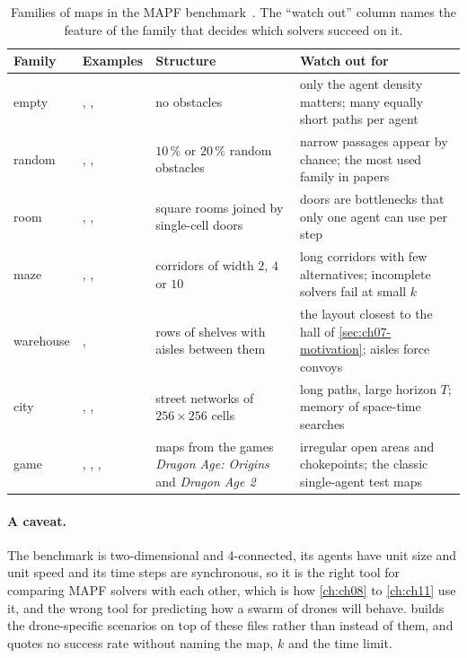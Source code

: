 \begin{table}[!htb]
  \centering\small
  \caption{Families of maps in the MAPF benchmark~\cite{stern2019mapf}. The
  ``watch out'' column names the feature of the family that decides which
  solvers succeed on it.}
  \label{tab:ch07-maps}
  \begin{tabularx}{\textwidth}{@{}lL{4.3cm}L{3.2cm}Y@{}}
  \toprule
  Family & Examples & Structure & Watch out for\\
  \midrule
  empty & , ,  & no obstacles & only the agent density matters; many equally short paths per agent\\
  random & , ,  & $10\,\%$ or $20\,\%$ random obstacles & narrow passages appear by chance; the most used family in papers\\
  room & , ,  & square rooms joined by single-cell doors & doors are bottlenecks that only one agent can use per step\\
  maze & , ,  & corridors of width $2$, $4$ or $10$ & long corridors with few alternatives; incomplete solvers fail at small $k$\\
  warehouse & ,  & rows of shelves with aisles between them & the layout closest to the hall of \cref{sec:ch07-motivation}; aisles force convoys\\
  city & , ,  & street networks of $256 \times 256$ cells & long paths, large horizon $T$; memory of space-time searches\\
  game & , , ,  & maps from the games \emph{Dragon Age: Origins} and \emph{Dragon Age 2} & irregular open areas and chokepoints; the classic single-agent test maps\\
  \bottomrule
  \end{tabularx}
\end{table}

\paragraph{A caveat.}
The benchmark is two-dimensional and 4-connected, its agents have unit size
and unit speed and its time steps are synchronous, so it is the right tool
for comparing MAPF solvers with each other, which is how \cref{ch:ch08} to
\cref{ch:ch11} use it, and the wrong tool for predicting how a swarm of
drones will behave.  builds the drone-specific scenarios on top
of these files rather than instead of them, and quotes no success rate
without naming the map, $k$ and the time limit.

